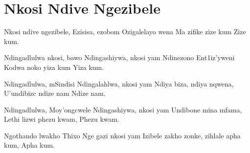 \starttocol
\chapter{Nkosi Ndive Ngezibele}
\nexttocol
\hfill{\it }
\stoptocol
\starttocol
\startlines
{\sc Nkosi} ndive ngezibele,
Ezisisa, ezobom
Ozigalelayo wena
Ma zifike zize kum
Zize kum.

Ndingadlulwa nkosi, bawo
Ndingashiywa, nkosi yam
Ndinezono Ent1iz'yweni
Kodwa noko yiza kum
Yiza kum.

Ndingadlulwa, mSindisi
Ndingalahlwa, nkosi yam 
Ndiya biza, ndiya nqwena,
U'undibizc ndize nam
Ndize nam.

Ndingadlulwa, Moy'ongcwele
Ndingashiywa, nkosi yam
Undibone mina mfama,
Lethi lizwi phezu kwam,
Phezu kwam.

Ngothando lwakho Thixo 
Nge gazi nkosi yam
Izibele zakho zonke,
zihlale apha kum,
Apha kum.
\stoplines
\nexttocol

\stoptocol
